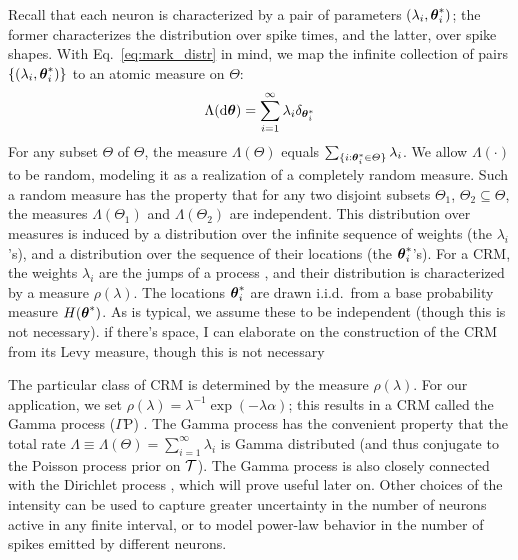Recall that each neuron is characterized by a pair of parameters $(\lambda_i, \boldsymbol{\theta}^*_i)$; the former characterizes the distribution over spike times, 
and the latter, over spike
shapes. With Eq.~\eqref{eq:mark_distr} in mind, we map the infinite collection of pairs $\{(\lambda_i, \boldsymbol{\theta}^*_i)\}$ to an atomic measure on $\Theta$:
\begin{align}
  \Lambda(\mathrm{d} \boldsymbol{\theta}) = \sum_{i=1}^{\infty} \lambda_i \delta_{\boldsymbol{\theta}^*_i}
\end{align}
For any subset $\varTheta$ of $\Theta$, the measure $\Lambda(\varTheta)$ equals \( \sum_{\{ i: \boldsymbol{\theta}^*_i \in \varTheta \} } \lambda_i\). We allow $\Lambda(\cdot)$ to be random,
modeling it as a realization of a completely random measure. Such a random measure has the property that for any two disjoint subsets $\varTheta_1$,  $\varTheta_2 \subseteq \Theta$, the measures $\Lambda(\varTheta_1)$ and $\Lambda(\varTheta_2)$ are independent. 
This distribution over measures is induced by a distribution
over the infinite sequence of weights (the $\lambda_i$'s), and a distribution over the sequence of their locations (the $\boldsymbol{\theta}^*_i$'s). 
For a CRM, the weights $\lambda_i$ are the jumps of a \Levy process \citep{Sato90}, and their distribution is characterized by a 
\Levy measure $\rho(\lambda)$. The locations $\boldsymbol{\theta}^*_i$ are drawn i.i.d.\  from a base probability measure $H(\boldsymbol{\theta}^*)$.
As is typical, we assume these to be independent (though this is not necessary). {\color{red} if there's space, I
can elaborate on the construction of the CRM from its Levy measure, though this is not necessary}

The particular class of CRM is determined by the \Levy measure $\rho(\lambda)$. For our application, we set $\rho(\lambda) = \lambda^{-1}\exp(-\lambda\alpha)$;
this results in a CRM called the Gamma process ($\Gamma$P) \citep{applebaum2004}. 
The Gamma process has the convenient property that the 
total rate $\Lambda \equiv \Lambda(\Theta) = \sum_{i=1}^{\infty} \lambda_i$ is Gamma distributed (and thus conjugate to the Poisson process prior on $\mathcal{T}$).
The Gamma process is also closely connected with the Dirichlet process \citep{Ferguson73}, which will prove useful
later on.
Other choices of the \Levy intensity can be used to capture greater uncertainty in the number of neurons active in any finite interval, or to model
power-law behavior in the number of spikes emitted by different neurons.

